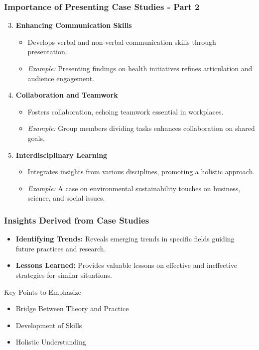 \documentclass{beamer}
\begin{document}
\begin{frame}[fragile]
    \frametitle{Importance of Presenting Case Studies - Part 2}
    \begin{enumerate}
        \setcounter{enumi}{2} %
        \item \textbf{Enhancing Communication Skills}
        \begin{itemize}
            \item Develops verbal and non-verbal communication skills through presentation.
            \item \textit{Example:} Presenting findings on health initiatives refines articulation and audience engagement.
        \end{itemize}
        
        \item \textbf{Collaboration and Teamwork}
        \begin{itemize}
            \item Fosters collaboration, echoing teamwork essential in workplaces.
            \item \textit{Example:} Group members dividing tasks enhances collaboration on shared goals.
        \end{itemize}
        
        \item \textbf{Interdisciplinary Learning}
        \begin{itemize}
            \item Integrates insights from various disciplines, promoting a holistic approach.
            \item \textit{Example:} A case on environmental sustainability touches on business, science, and social issues.
        \end{itemize}
    \end{enumerate}
\end{frame}

\begin{frame}[fragile]
    \frametitle{Insights Derived from Case Studies}
    \begin{itemize}
        \item \textbf{Identifying Trends:} Reveals emerging trends in specific fields guiding future practices and research.
        \item \textbf{Lessons Learned:} Provides valuable lessons on effective and ineffective strategies for similar situations.
    \end{itemize}

    \begin{block}{Key Points to Emphasize}
        \begin{itemize}
            \item Bridge Between Theory and Practice
            \item Development of Skills
            \item Holistic Understanding
        \end{itemize}
    \end{block}
\end{frame}
\end{document}
